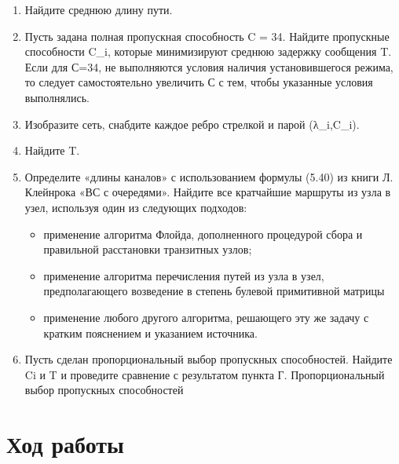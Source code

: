 \documentclass[14pt,a4paper,report]{report}
\begin{document}
\begin{enumerate}
    \item Найдите среднюю длину пути.
        \item Пусть задана полная пропускная способность C = 34. Найдите пропускные способности {C_i}, которые минимизируют среднюю задержку сообщения T. Если для С=34, не выполняются условия наличия установившегося режима, то следует самостоятельно увеличить С с тем, чтобы указанные условия выполнялись.
            \item 	Изобразите сеть, снабдите каждое ребро стрелкой и парой (λ_i,C_i).

                \item 	Найдите T.

                    \item Определите «длины каналов» с использованием формулы (5.40) из книги Л. Клейнрока «ВС с очередями». Найдите все кратчайшие маршруты из узла в узел, используя один из следующих подходов:
                    
                    \begin{itemize}
    \item 	применение алгоритма Флойда, дополненного процедурой сбора и правильной расстановки транзитных узлов;

        \item 	применение алгоритма перечисления путей из узла в узел, предполагающего возведение в степень булевой примитивной матрицы

            \item 	применение любого другого алгоритма, решающего эту же задачу с кратким пояснением и указанием источника.

\end{itemize}
                    
                    
                    
                        \item 	Пусть сделан пропорциональный выбор пропускных способностей. Найдите {Ci} и T и проведите сравнение с результатом пункта Г. Пропорциональный выбор пропускных способностей 

\end{enumerate}





\clearpage


\section{Ход работы}
\end{document}
